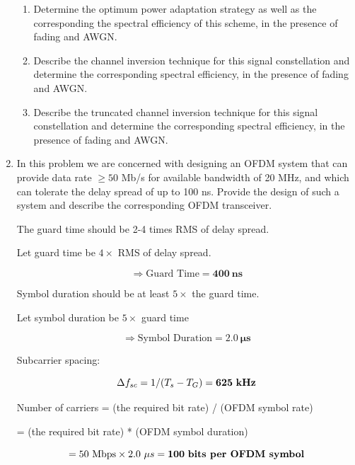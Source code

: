 \documentclass[fleqn]{article}
\begin{document}
\begin{enumerate}
\begin{enumerate}
			\item Determine the optimum power adaptation strategy as well as the corresponding the spectral efficiency of this scheme, in the presence of fading and AWGN.
			
			\item Describe the channel inversion technique for this signal constellation and determine the corresponding spectral efficiency, in the presence of fading and AWGN.
			
			\item Describe the truncated channel inversion technique for this signal constellation and determine the corresponding spectral efficiency, in the presence of fading and AWGN.
		\end{enumerate}
		
		\item In this problem we are concerned with designing an OFDM system that can provide data rate $\geq 50$ Mb/s for available bandwidth of 20 MHz, and which can tolerate the delay spread of up to 100 ns. Provide the design of such a system and describe the corresponding OFDM transceiver.
		
		The guard time should be 2-4 times RMS of delay spread.
		
		Let guard time be $4\times$ RMS of delay spread.
		
		\begin{equation*}
			\Rightarrow \text{Guard Time} = \mathbf{400\ ns}
		\end{equation*}
		
		Symbol duration should be at least $5\times$ the guard time. 
		
		Let symbol duration be $5\times$ guard time
		
		\begin{equation*}
			\Rightarrow \text{Symbol Duration} = \mathbf{2.0\ \mu{s}}
		\end{equation*}
		
		Subcarrier spacing:
		
		\begin{equation*}
			{\Delta}f_{sc} = 1/(T_s - T_G) = \mathbf{625\ \text{\textbf{kHz}}}
		\end{equation*}
		
		Number of carriers = (the required bit rate) / (OFDM symbol rate)
		
		= (the required bit rate) * (OFDM symbol duration)
		 
		\begin{equation*}
			= 50\ \text{Mbps} \times 2.0\ {\mu}s = \mathbf{100\ \text{\textbf{bits per OFDM symbol}}}
		\end{equation*}
		

\end{enumerate}
\end{document}
